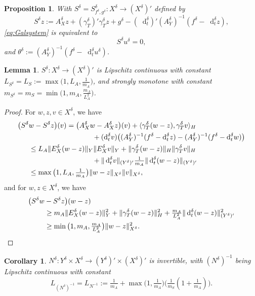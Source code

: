 \documentclass{amsart}
\newtheorem{lemma}[theorem]{Lemma}
\newtheorem{proposition}[theorem]{Proposition}
\newtheorem{corollary}[theorem]{Corollary}
\numberwithin{equation}{section}
\newcommand{\NN}{N}
\newcommand{\1}{\mathbb 1}
\newcommand*\diff{\mathop{}\!\mathrm{d}}
\begin{document}
\begin{proposition} \label{prop:equivSchur} With $S^\delta=S_{f^\delta,g^\delta}^\delta\colon X^\delta \rightarrow (X^\delta)'$ defined by
$$
S^\delta z:=A_X^\delta z+(\gamma_T^\delta)'\gamma_T^\delta z+g^\delta-(\diff_t^\delta)' (A_Y^\delta)^{-1}(f^\delta-\diff_t^\delta z),
$$
\eqref{eq:Galsystem} is equivalent to
$$
S^\delta u^\delta=0,
$$
and $\theta^\delta:=(A_Y^\delta)^{-1}(f^\delta-\diff_t^\delta u^\delta)$.
\end{proposition}

\begin{lemma} \label{lem:Schur} $S^\delta:X^\delta \rightarrow (X^\delta)'$ is Lipschitz continuous with constant $L_{S^\delta}=L_{S}:=\max\big(1,L_A,\tfrac{1}{m_A} \big)$, and strongly monotone with constant $m_{S^\delta}=m_{S}=\min\big(1,m_A,\tfrac{m_A}{L_A^2}\big)$.
\end{lemma}

\begin{proof} For $w,z, v \in X^\delta$, we have
\begin{align*}
\big(S^\delta&w-S^\delta z\big)(v)=\big(A_X^\delta w-A_X^\delta z\big)(v)+\langle \gamma_T^\delta(w-z),\gamma_T^\delta v\rangle_H\\
&\hspace*{9em}  +(\diff_t^\delta v)\big((A_Y^\delta)^{-1}(f^\delta-\diff^\delta_t z)-(A_Y^\delta)^{-1}(f^\delta-\diff^\delta_t w)\big)\\
&\leq L_A \|E_X^\delta(w-z)\|_Y \|E_X^\delta v\|_Y+\| \gamma_T^\delta(w-z)\|_H \|\gamma_T^\delta v\|_H\\
&\hspace*{9em} +\|\diff_t^\delta v\|_{(Y^\delta)'} \tfrac{1}{m_A} \|\diff^\delta_t(w-z)\|_{(Y^\delta)'} \\
& \leq \max\big(1,L_A,\tfrac{1}{m_A} \big)\|w-z\|_{X^\delta} \|v\|_{X^\delta},
\end{align*}
and for $w,z \in X^\delta$, we have
\begin{align*}
\big(S^\delta w&-S^\delta z\big)(w-z) \\
&\geq m_A\|E_X^\delta(w-z)\|_Y^2+\|\gamma_T^\delta(w-z)\|_H^2+\tfrac{m_A}{L_A^2}\|\diff_t^\delta(w-z)\|_{(Y^\delta)'}^2\\
& \geq \min\big(1,m_A,\tfrac{m_A}{L_A^2}\big)\|w-z\|_{X^\delta}^2. \qedhere
\end{align*}
\end{proof}
 
\begin{corollary} \label{corol:stability} $\NN^\delta\colon Y^\delta \times X^\delta \rightarrow (Y^\delta)' \times (X^\delta)'$ is invertible, with $(\NN^\delta)^{-1}$  being \emph{Lipschitz continuous} with constant
 $$
 L_{(\NN^\delta)^{-1}}= L_{\NN^{-1}}:=\tfrac{1}{m_A}+\max\big(1,\tfrac{1}{m_A})\big(\tfrac{1}{m_S}(1+\tfrac{1}{m_A})\big).
 $$ 
\end{corollary}
\end{document}
